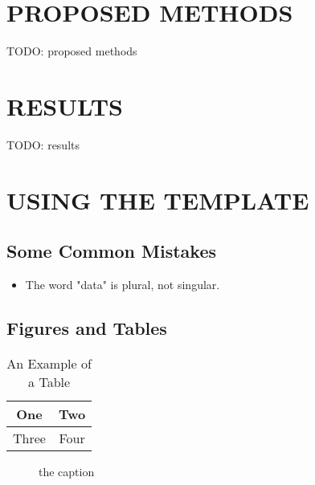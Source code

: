 \documentclass[letterpaper, 10 pt, conference]{ieeeconf}  %
\begin{document}

\section{PROPOSED METHODS}
TODO: proposed methods

\section{RESULTS}
TODO: results

\section{USING THE TEMPLATE}
\subsection{Some Common Mistakes}
\begin{itemize}
  \item The word "data" is plural, not singular.
\end{itemize}

\subsection{Figures and Tables}

\begin{table}[h]
  \caption{An Example of a Table}
  \label{table_example}
  \begin{center}
    \begin{tabular}{|c||c|}
      \hline
      One   & Two  \\
      \hline
      Three & Four \\
      \hline
    \end{tabular}
  \end{center}
\end{table}


\begin{figure}[thpb]
  \centering
  \caption{the caption}
  \label{figurelabel}
\end{figure}




\end{document}

